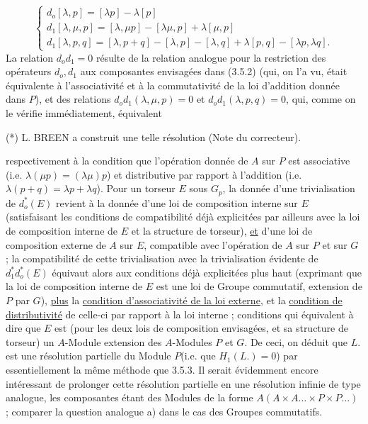 \begin{equation}\tag{3.5.6}
\left\{
\begin{array}{l}
d_o[\lambda,p] = [\lambda p] - \lambda[p] \\[4pt]
d_1[\lambda,\mu,p] = [\lambda,\mu p] - [\lambda\mu ,p] + \lambda[\mu,p] \\[4pt]
d_1[\lambda,p,q] = [\lambda,p+q] - [\lambda,p] - [\lambda,q] + \lambda[p,q] - [\lambda p,\lambda q].
\end{array}
\right.
\end{equation}
La relation $d_o d_1 = 0$ résulte de la relation analogue pour la restriction des opérateurs $d_o,d_1$ aux composantes envisagées dans (3.5.2) (qui, on l'a vu, était équivalente à l'associativité et à la commutativité de la loi d'addition donnée dans $P$), et des relations $d_o d_1(\lambda,\mu,p) = 0$ et $d_o d_1(\lambda,p,q) = 0$, qui, comme on le vérifie immédiatement, équivalent 

(*)  L. BREEN a construit une telle résolution (Note du correcteur).



 respectivement à la condition que l'opération donnée de $A$ sur $P$ est associative (i.e. $\lambda(\mu p) = (\lambda\mu)p$) et distributive par rapport à l'addition (i.e. $\lambda(p+q) = \lambda p + \lambda q$). Pour un torseur $E$ sous $G_p$, la donnée d'une trivialisation de $d_o^*(E)$ revient à la donnée d'une loi de composition interne sur $E$ (satisfaisant les conditions de compatibilité déjà explicitées par ailleurs avec la loi de composition interne de $E$ et la structure de torseur), \underline{et} d'une loi de composition externe de $A$ sur $E$, compatible avec l'opération de $A$ sur $P$ et sur $G$ ; la compatibilité de cette trivialisation avec la trivialisation évidente de $d_1^* d_o^*(E)$ équivaut alors aux conditions déjà explicitées plus haut (exprimant que la loi de composition interne de $E$ est une loi de Groupe commutatif, extension de $P$ par $G$), \underline{plus} la \underline{condition d'associativité de la loi externe}, et la \underline{condition de distributivité} de celle-ci par rapport à la loi interne ; conditions qui équivalent à dire que $E$ est (pour les deux lois de composition envisagées, et sa structure de torseur) un $A$-Module extension des $A$-Modules $P$ et $G$. De ceci, on déduit que $L.$ est une résolution partielle du Module $P$(i.e. que $H_1(L.) = 0$) par essentiellement la même méthode que 3.5.3. Il serait évidemment encore intéressant de prolonger cette résolution partielle en une résolution infinie de type analogue, les composantes étant des Modules de la forme $A(A \times A \ldots \times P \times P \ldots)$ ; comparer la question analogue a) dans le cas des Groupes commutatifs.




